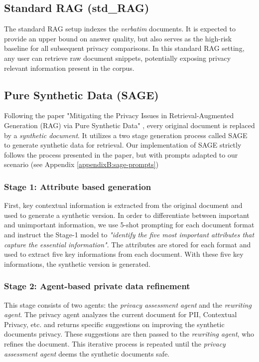 \subsection*{Standard {RAG} (std\_RAG)}
The standard {RAG} setup indexes the \textit{verbatim} documents. It is expected to provide an upper bound on answer quality, but also serves as the high-risk baseline for all subsequent privacy comparisons. In this standard {RAG} setting, any user can retrieve raw document snippets, potentially exposing privacy relevant information present in the corpus. 

\subsection*{Pure Synthetic Data (SAGE)}\label{evaluation-subsec:sage}
Following the paper "Mitigating the Privacy Issues in Retrieval-Augmented Generation (RAG) via Pure Synthetic Data" \cite{ragSAGE}, every original document is replaced by a \emph{synthetic document}. It utilizes a two stage generation process called {SAGE} to generate synthetic data for retrieval. Our implementation of {SAGE} strictly follows the process presented in the paper, but with prompts adapted to our scenario (see Appendix \ref{appendixB:sage-prompts})

\subsubsection*{Stage 1: Attribute based generation}
First, key contextual information is extracted from the original document and used to generate a synthetic version. In order to differentiate between important and unimportant information, we use 5-shot prompting for each document format and instruct the Stage-1 model to \textit{"identify the five most important attributes that capture the essential information"}. The attributes are stored for each format and used to extract five key informations from each document. With these five key informations, the synthetic version is generated.

\subsubsection*{Stage 2: Agent-based private data refinement}
This stage consists of two agents: the \textit{privacy assessment agent} and the \textit{rewriting agent}. The privacy agent analyzes the current document for {PII}, Contextual Privacy, etc. and returns specific suggestions on improving the synthetic documents privacy. These suggestions are then passed to the \textit{rewriting agent}, who refines the document. This iterative process is repeated until the  \textit{privacy assessment agent} deems the synthetic documents safe.

